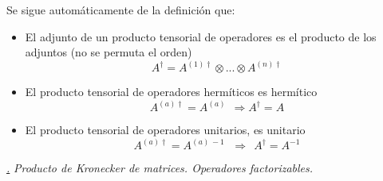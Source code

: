 \documentclass[a4paper,11pt]{book} %
\numberwithin{equation}{chapter}
\def\subsubiContadorIt{\par\addtocounter{subsubsection}{1}\underline{\it\thesubsubsection.}\hskip0.5cm \setcounter{subsubsubsectionIt}{0}}
\newcommand{\SubsubiIt}[1]{
		\subsubiContadorIt \textit{#1}
	}
\newcounter{subsubsubsectionIt}[subsubsection]
\begin{document}
Se sigue automáticamente de la definición que:
\begin{itemize}
	\item El adjunto de un producto tensorial de operadores es el producto de los adjuntos (no se permuta el orden)
		\begin{equation}
		A^\dagger = A^{(1)\dagger} \otimes ... \otimes A^{(n)\dagger}
		\end{equation}
	\item El producto tensorial de operadores hermíticos es hermítico
	\begin{equation} 
	A^{(a)\dagger} = A^{(a)} ~~\Longrightarrow A^{\dagger} = A 
	\end{equation}
	\item El producto tensorial de operadores unitarios, es unitario
	\begin{equation} 
	A^{(a)\dagger} = A^{(a)\, -1} \,  ~~\Longrightarrow ~~A^{\dagger} = A^{-1} 
	\end{equation}
\end{itemize}



			\SubsubiIt{Producto de Kronecker de matrices. Operadores factorizables.}
\end{document}
